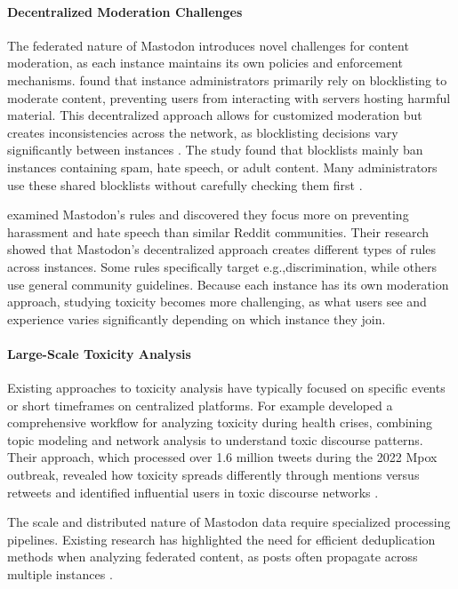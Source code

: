 \paragraph{Decentralized Moderation Challenges}
The federated nature of Mastodon introduces novel challenges for content moderation, as each instance maintains its own policies and enforcement mechanisms. \citet{bono:2024} found that instance administrators primarily rely on blocklisting to moderate content, preventing users from interacting with servers hosting harmful material. This decentralized approach allows for customized moderation but creates inconsistencies across the network, as blocklisting decisions vary significantly between instances \cite{nicholson:2023}. The study found that blocklists mainly ban instances containing spam, hate speech, or adult content. Many administrators use these shared blocklists without carefully checking them first \cite{bono:2024}.

\citet{nicholson:2023} examined Mastodon's rules and discovered they focus more on preventing harassment and hate speech than similar Reddit communities. Their research showed that Mastodon's decentralized approach creates different types of rules across instances. Some rules specifically target e.g.,discrimination, while others use general community guidelines. Because each instance has its own moderation approach, studying toxicity becomes more challenging, as what users see and experience varies significantly depending on which instance they join.

\paragraph{Large-Scale Toxicity Analysis}
Existing approaches to toxicity analysis have typically focused on specific events or short timeframes on centralized platforms. For example \citet{fan:2022} developed a comprehensive workflow for analyzing toxicity during health crises, combining topic modeling and network analysis to understand toxic discourse patterns. Their approach, which processed over 1.6 million tweets during the 2022 Mpox outbreak, revealed how toxicity spreads differently through mentions versus retweets and identified influential users in toxic discourse networks \cite{fan:2022}.

The scale and distributed nature of Mastodon data require specialized processing pipelines. Existing research has highlighted the need for efficient deduplication methods when analyzing federated content, as posts often propagate across multiple instances \cite{bono:2024}.

